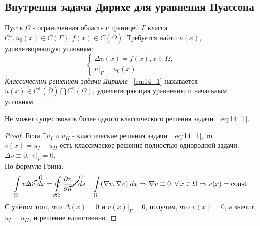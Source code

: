 \documentclass[../main.tex]{subfiles}
\begin{document}
\subsection{Внутрення задача Дирихе для уравнения Пуассона}
Пусть $\Omega$ - ограниченная область с границей $\Gamma$ класса $C^1, u_0(x) \in C(\Gamma), f(x) \in C(\overline{\Omega})$. Требуется найти $u(x)$, удовлетворяющую условиям:
\begin{equation}
\label{eq:14_1}
	\begin{cases}
		\Delta u(x) = f(x), x \in \Omega, \\
		u\bigr|_{\Gamma} = u_0(x).
	\end{cases}
\end{equation}
\textit{Классическим решением задачи Дирихле} ~\ref{eq:14_1} называется $u(x) \in C^1(\overline{\Omega}) \bigcap C^2({\Omega})$, удовлетворяющая уравнению и начальным условиям. \\
\begin{lemma}
Не может существовать более одного классического решения задачи ~\ref{eq:14_1}.
\end{lemma}
\begin{proof}
Если $\exists u_{I}$ и $u_{II}$ - классические решения задачи ~\ref{eq:14_1}, то $v(x) = u_{I} - u_{II}$ есть классическое решение полностью однородной задачи: $\Delta v \equiv 0,\; v\bigr|_{\Gamma} = 0$. \\
По формуле Грина:
\begin{equation*}
	\int\limits_{\Omega} v\cancelto{0}{\Delta v}\; dx = \oint\limits_{\partial \Omega}\dfrac{\partial v}{\partial \vec{n}}\cancelto{0}{v}\;ds - \int\limits_{\Omega}(\nabla v, \nabla v)\;dx \Rightarrow \nabla v \equiv 0 \;\;\forall\: x \in \Omega \Rightarrow v(x) = \text{const}
\end{equation*}
С учётом того, что $\Delta(x) = 0$ и $v(x)\bigr|_{\Gamma} = 0$, получим, что $v(x) = 0$, а значит, $u_{I} = u_{II}$, и решение единственно.
\end{proof}
\end{document}
